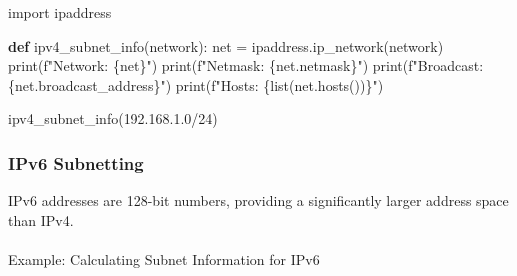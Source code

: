 \documentclass[
  letterpaper,
  DIV=11,
  numbers=noendperiod]{scrreprt}
\makeatletter
\let\oldparagraph\paragraph
\renewcommand{\paragraph}{
    \@ifstar
      \xxxParagraphStar
      \xxxParagraphNoStar
  }
\newcommand{\xxxParagraphStar}[1]{\oldparagraph*{#1}\mbox{}}
\newcommand{\xxxParagraphNoStar}[1]{\oldparagraph{#1}\mbox{}}
\newenvironment{Shaded}{\begin{snugshade}}{\end{snugshade}}
\newcommand{\BuiltInTok}[1]{\textcolor[rgb]{0.00,0.23,0.31}{#1}}
\newcommand{\ImportTok}[1]{\textcolor[rgb]{0.00,0.46,0.62}{#1}}
\newcommand{\KeywordTok}[1]{\textcolor[rgb]{0.00,0.23,0.31}{\textbf{#1}}}
\newcommand{\NormalTok}[1]{\textcolor[rgb]{0.00,0.23,0.31}{#1}}
\newcommand{\OperatorTok}[1]{\textcolor[rgb]{0.37,0.37,0.37}{#1}}
\newcommand{\SpecialCharTok}[1]{\textcolor[rgb]{0.37,0.37,0.37}{#1}}
\newcommand{\SpecialStringTok}[1]{\textcolor[rgb]{0.13,0.47,0.30}{#1}}
\newcommand{\StringTok}[1]{\textcolor[rgb]{0.13,0.47,0.30}{#1}}
\makeatother
\begin{document}
\begin{Shaded}
\begin{Highlighting}[]
\ImportTok{import}\NormalTok{ ipaddress}

\KeywordTok{def}\NormalTok{ ipv4\_subnet\_info(network):}
\NormalTok{    net }\OperatorTok{=}\NormalTok{ ipaddress.ip\_network(network)}
    \BuiltInTok{print}\NormalTok{(}\SpecialStringTok{f"Network: }\SpecialCharTok{\{}\NormalTok{net}\SpecialCharTok{\}}\SpecialStringTok{"}\NormalTok{)}
    \BuiltInTok{print}\NormalTok{(}\SpecialStringTok{f"Netmask: }\SpecialCharTok{\{}\NormalTok{net}\SpecialCharTok{.}\NormalTok{netmask}\SpecialCharTok{\}}\SpecialStringTok{"}\NormalTok{)}
    \BuiltInTok{print}\NormalTok{(}\SpecialStringTok{f"Broadcast: }\SpecialCharTok{\{}\NormalTok{net}\SpecialCharTok{.}\NormalTok{broadcast\_address}\SpecialCharTok{\}}\SpecialStringTok{"}\NormalTok{)}
    \BuiltInTok{print}\NormalTok{(}\SpecialStringTok{f"Hosts: }\SpecialCharTok{\{}\BuiltInTok{list}\NormalTok{(net.hosts())}\SpecialCharTok{\}}\SpecialStringTok{"}\NormalTok{)}

\NormalTok{ipv4\_subnet\_info(}\StringTok{\textquotesingle{}192.168.1.0/24\textquotesingle{}}\NormalTok{)}
\end{Highlighting}
\end{Shaded}

\subsubsection{IPv6 Subnetting}\label{ipv6-subnetting}

IPv6 addresses are 128-bit numbers, providing a significantly larger
address space than IPv4.

\paragraph{Example: Calculating Subnet Information for
IPv6}\label{example-calculating-subnet-information-for-ipv6}
\end{document}

